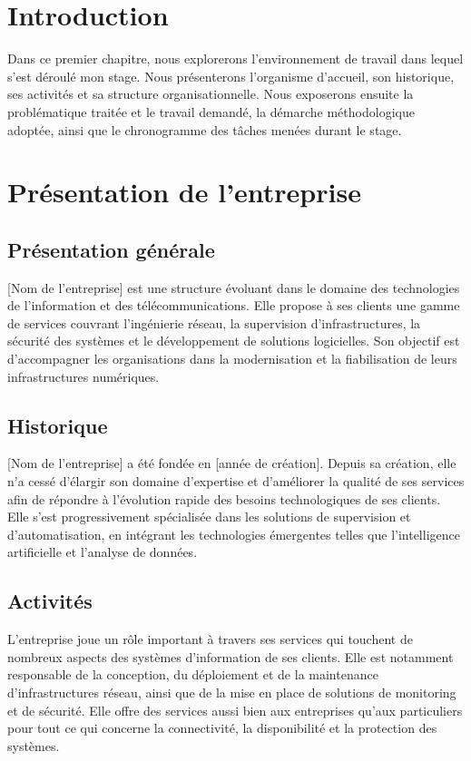 \documentclass[12pt,a4paper]{report}
\begin{document}
\section{Introduction}
Dans ce premier chapitre, nous explorerons l'environnement de travail dans lequel
s'est déroulé mon stage. Nous présenterons l'organisme d'accueil, son historique,
ses activités et sa structure organisationnelle. Nous exposerons ensuite la
problématique traitée et le travail demandé, la démarche méthodologique adoptée,
ainsi que le chronogramme des tâches menées durant le stage.

\section{Présentation de l'entreprise}

\subsection{Présentation générale}
[Nom de l'entreprise] est une structure évoluant dans le domaine des technologies
de l'information et des télécommunications. Elle propose à ses clients une gamme de
services couvrant l'ingénierie réseau, la supervision d'infrastructures, la
sécurité des systèmes et le développement de solutions logicielles. Son objectif
est d'accompagner les organisations dans la modernisation et la fiabilisation de
leurs infrastructures numériques.

\subsection{Historique}
[Nom de l'entreprise] a été fondée en [année de création]. Depuis sa création,
elle n'a cessé d'élargir son domaine d'expertise et d'améliorer la qualité de ses
services afin de répondre à l'évolution rapide des besoins technologiques de ses
clients. Elle s'est progressivement spécialisée dans les solutions de supervision
et d'automatisation, en intégrant les technologies émergentes telles que
l'intelligence artificielle et l'analyse de données.

\subsection{Activités}
L'entreprise joue un rôle important à travers ses services qui touchent de
nombreux aspects des systèmes d'information de ses clients. Elle est notamment
responsable de la conception, du déploiement et de la maintenance
d'infrastructures réseau, ainsi que de la mise en place de solutions de
monitoring et de sécurité. Elle offre des services aussi bien aux entreprises
qu'aux particuliers pour tout ce qui concerne la connectivité, la disponibilité et
la protection des systèmes.
\end{document}
